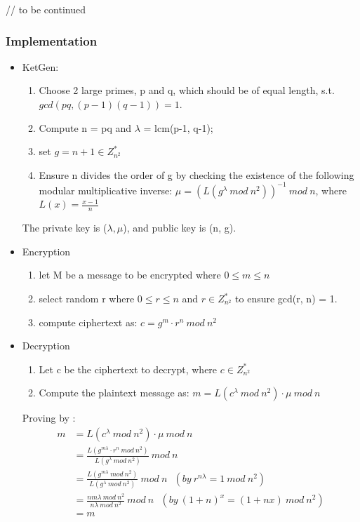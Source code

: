 \documentclass[a4paper,11pt]{article}
\begin{document}
// to be continued


\subsubsection {Implementation}

\begin{itemize}
\item KetGen: 
\begin{enumerate}
\item Choose 2 large primes, p and q, which should be of equal length, s.t. $gcd(pq, (p-1)(q-1)) = 1$.
\item Compute n = pq and $\lambda$ = lcm(p-1, q-1);
\item set $g = n+1 \in Z_{n^2}^{*}$
\item Ensure n divides the order of g by checking the existence of the following modular multiplicative inverse:  $\mu  = (L(g^{\lambda}\ mod\ n^2))^{-1}\ mod\ n$, where $L(x) = \frac{x-1}{n}$
\end{enumerate}

The private key is ($\lambda,\mu$), and public key is (n, g).

\item Encryption
\begin{enumerate}
\item let M be a message to be encrypted where $0 \leq m \leq n$
\item select random r where $0 \le r \le n$ and $r \in Z_{n^2}^{*}$ to ensure gcd(r, n) = 1.
\item compute ciphertext as: $c = g^m \cdot r^n\ mod\  n^2$
\end{enumerate}

\item Decryption
\begin{enumerate}
\item Let c be the ciphertext to decrypt, where $c \in Z_{n^2}^{*}$
\item Compute the plaintext message as: $m = L(c^{\lambda}\ mod\ n^2)\cdot \mu\ mod\ n$
\end{enumerate}

Proving by :
\begin{equation}
\begin{split}
m &= L(c^{\lambda}\ mod\ n^2)\cdot \mu\ mod\ n    \\
  &= \frac{L(g^{m\lambda} \cdot r^n\ mod\ n^2) } {L(g^{\lambda}\ mod\ n^2)}\ mod\ n      \\
  &=  \frac{L(g^{m\lambda}\ mod\ n^2)} {L(g^{\lambda}\ mod\ n^2)}\ mod\ n \  \ \ (by\ r^{n\lambda} = 1\ mod\ n^2) \\
  &= \frac{nm\lambda\ mod\ n^2} {n\lambda\ mod\ n^2}\ mod\ n   \ \ \ (by\ (1+n)^x = (1 + nx)\ mod\ n^2) \\
  &= m 
\end{split}
\end{equation}


\end{itemize}
\end{document}

